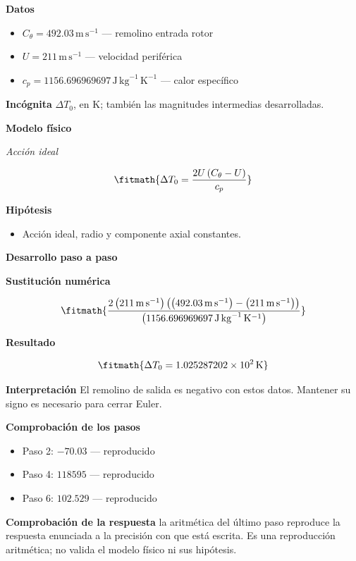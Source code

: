 \documentclass[10pt,openany]{book}
\begin{document}
\noindent\textbf{Datos}
\begin{itemize}
\item $C_\theta = 492.03\,\mathrm{m}\,\mathrm{s}^{-1}$ — remolino entrada rotor
\item $U = 211\,\mathrm{m}\,\mathrm{s}^{-1}$ — velocidad periférica
\item $c_p = 1156.696969697\,\mathrm{J}\,\mathrm{kg}^{-1}\,\mathrm{K}^{-1}$ — calor específico
\end{itemize}

\noindent\textbf{Incógnita}
$\Delta T_0$, en $\mathrm{K}$; también las magnitudes intermedias desarrolladas.

\noindent\textbf{Modelo físico}

\noindent\textit{Acción ideal}

\[
\fitmath{\Delta T_0=\frac{2 U \left(C_\theta - U\right)}{c_p}}
\]

\noindent\textbf{Hipótesis}
\begin{itemize}
\item Acción ideal, radio y componente axial constantes.
\end{itemize}

\noindent\textbf{Desarrollo paso a paso}



\noindent\textbf{Sustitución numérica}

\[
\fitmath{\frac{2 \left(211\,\mathrm{m}\,\mathrm{s}^{-1}\right) \left(\left(492.03\,\mathrm{m}\,\mathrm{s}^{-1}\right) - \left(211\,\mathrm{m}\,\mathrm{s}^{-1}\right)\right)}{\left(1156.696969697\,\mathrm{J}\,\mathrm{kg}^{-1}\,\mathrm{K}^{-1}\right)}}
\]

\noindent\textbf{Resultado}

\[
\fitmath{\Delta T_0=1.025287202\times10^{2}\,\mathrm{K}}
\]

\noindent\textbf{Interpretación}
El remolino de salida es negativo con estos datos. Mantener su signo es necesario para cerrar Euler.

\noindent\textbf{Comprobación de los pasos}
\begin{itemize}
\item Paso 2: $-70.03$ — reproducido
\item Paso 4: $118595$ — reproducido
\item Paso 6: $102.529$ — reproducido
\end{itemize}

\noindent\textbf{Comprobación de la respuesta} la aritmética del último paso reproduce la respuesta enunciada a la precisión con que está escrita. Es una reproducción aritmética; no valida el modelo físico ni sus hipótesis.
\end{document}
